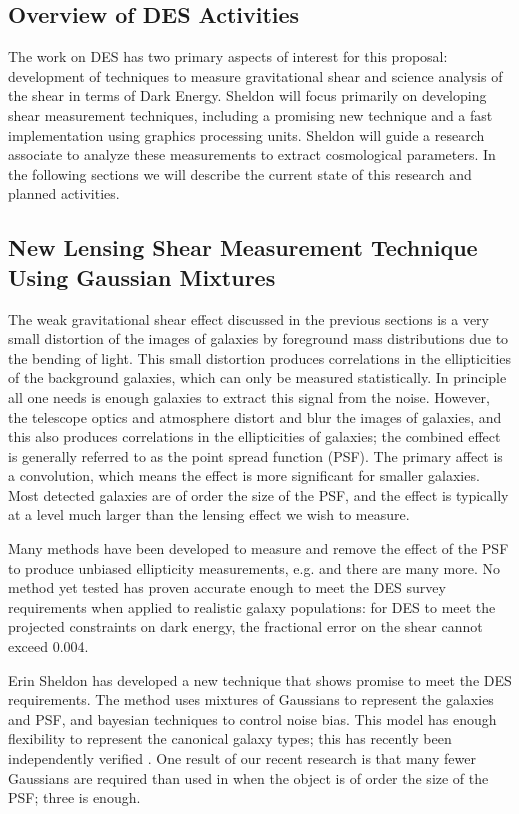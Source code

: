 \documentclass[12pt]{article}
\begin{document}
\subsection{Overview of DES Activities}

The work on DES has two primary aspects of interest for this proposal:
development of techniques to measure gravitational shear and science analysis
of the shear in terms of Dark Energy.  Sheldon will focus primarily on
developing shear measurement techniques, including a promising new technique
and a fast implementation using graphics processing units.  Sheldon will guide
a research associate to analyze these measurements to extract cosmological
parameters.  In the following sections we will describe the current state of
this research and planned activities.

\subsection{New Lensing Shear Measurement Technique Using Gaussian Mixtures}
\label{sec:gmix}

The weak gravitational shear effect discussed in the previous sections is a
very small distortion of the images of galaxies by foreground mass
distributions due to the bending of light.  This small distortion produces
correlations in the ellipticities of the background galaxies, which can only be
measured statistically.  In principle all one needs is enough galaxies to
extract this signal from the noise.  However, the telescope optics and
atmosphere distort and blur the images of galaxies, and this also produces
correlations in the ellipticities of galaxies; the combined effect is generally
referred to as the point spread function (PSF). The primary affect is a
convolution, which means the effect is more significant for smaller galaxies.
Most detected galaxies are of order the size of the PSF, and the effect is
typically at a level much larger than the lensing effect we wish to measure.

Many methods have been developed to measure and remove the effect of the PSF to
produce unbiased ellipticity measurements, e.g.
\cite{ksb95,Bern02,Miller07,Melchior11} and there are many more.  No method yet
tested has proven accurate enough to meet the DES survey requirements when
applied to realistic galaxy populations:  for DES to meet the projected
constraints on dark energy, the fractional error on the shear cannot exceed
0.004.

Erin Sheldon has developed a new technique that shows promise to meet the DES
requirements.  The method uses mixtures of Gaussians to represent the galaxies
and PSF, and bayesian techniques to control noise bias.  This model has enough
flexibility to represent the canonical galaxy types; this has recently been
independently verified \citep{HoggGMix12}.  One result of our recent research
is that many fewer Gaussians are required than used in \cite{HoggGMix12} when
the object is of order the size of the PSF; three is enough.  
\end{document}
